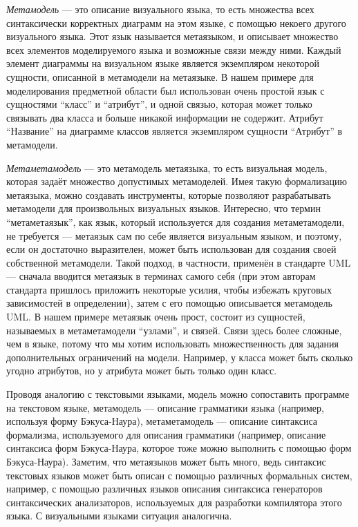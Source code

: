 \textit{Метамодель} --- это описание визуального языка, то есть множества всех 
синтаксически корректных диаграмм на этом языке, с помощью некоего другого 
визуального языка. Этот язык называется метаязыком, и описывает множество всех 
элементов моделируемого языка и возможные связи между ними. Каждый элемент 
диаграммы на визуальном языке является экземпляром некоторой сущности, описанной 
в метамодели на метаязыке. В нашем примере для моделирования предметной области 
был использован очень простой язык с сущностями "`класс"' и "`атрибут"', и одной 
связью, которая может только связывать два класса и больше никакой информации 
не содержит. Атрибут "`Название"' на диаграмме классов является экземпляром 
сущности "`Атрибут"' в метамодели.

\textit{Метаметамодель} --- это метамодель метаязыка, то есть визуальная модель, 
которая задаёт множество допустимых метамоделей. Имея такую формализацию 
метаязыка, можно создавать инструменты, которые позволяют разрабатывать 
метамодели для произвольных визуальных языков. Интересно, что термин 
"`метаметаязык"', как язык, который используется для создания метаметамодели, 
не требуется --- метаязык сам по себе является визуальным языком, и поэтому, 
если он достаточно выразителен, может быть использован для создания своей 
собственной метамодели. Такой подход, в частности, применён в стандарте UML 
--- сначала вводится метаязык в терминах самого себя (при этом авторам стандарта 
пришлось приложить некоторые усилия, чтобы избежать круговых зависимостей в 
определении), затем с его помощью описывается метамодель UML. В нашем примере 
метаязык очень прост, состоит из сущностей, называемых в метаметамодели 
"`узлами"', и связей. Связи здесь более сложные, чем в языке, потому что мы 
хотим использовать множественность для задания дополнительных ограничений на 
модели. Например, у класса может быть сколько угодно атрибутов, но у атрибута 
может быть только один класс.

Проводя аналогию с текстовыми языками, модель можно сопоставить программе на 
текстовом языке, метамодель --- описание грамматики языка (например, используя 
форму Бэкуса-Наура), метаметамодель --- описание синтаксиса формализма, 
используемого для описания грамматики (например, описание синтаксиса форм 
Бэкуса-Наура, которое тоже можно выполнить с помощью форм Бэкуса-Наура). 
Заметим, что метаязыков может быть много, ведь синтаксис текстовых языков может 
быть описан с помощью различных формальных систем, например, с помощью различных 
языков описания синтаксиса генераторов синтаксических анализаторов, используемых 
для разработки компилятора этого языка. С визуальными языками ситуация 
аналогична.

